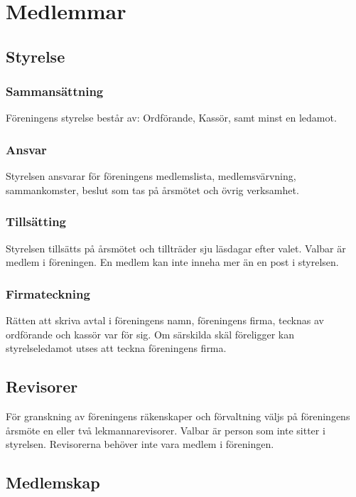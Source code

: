 \section{Medlemmar}

\subsection{Styrelse} \label{sec:sammansättning-styrelse}

\subsubsection{Sammansättning} 
Föreningens styrelse består av: Ordförande, Kassör, samt minst en ledamot.

\subsubsection{Ansvar}
Styrelsen ansvarar för föreningens medlemslista, medlemsvärvning, sammankomster, beslut som tas på årsmötet och övrig verksamhet.

\subsubsection{Tillsätting}
Styrelsen tillsätts på årsmötet och tillträder sju läsdagar efter valet. Valbar är medlem i föreningen. En medlem kan inte inneha mer än en post i styrelsen.

\subsubsection{Firmateckning}
Rätten att skriva avtal i föreningens namn, föreningens firma, tecknas av ordförande och kassör var för sig. Om särskilda skäl föreligger kan styrelseledamot utses att teckna föreningens firma.




\subsection{Revisorer}
För granskning av föreningens räkenskaper och förvaltning väljs på föreningens årsmöte en eller två lekmannarevisorer. Valbar är person som inte sitter i styrelsen. Revisorerna behöver inte vara medlem i föreningen.



\subsection{Medlemskap}

